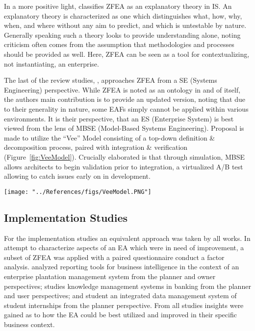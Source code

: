 \documentclass[12pt,conference]{IEEEtran}
\begin{document}
In a more positive light, \cite{zfea_as_is_theory} classifies ZFEA as an explanatory theory in IS. 
An explanatory theory is characterized as one which distinguishes what, how, why, when, and where without any aim to predict, and which is untestable by nature. 
Generally speaking such a theory looks to provide understanding alone, noting criticism often comes from the assumption that methodologies and processes should be provided as well. 
Here, ZFEA can be seen as a tool for contextualizing, not instantiating, an enterprise. 

The last of the review studies, \cite{complex_systems_engineering}, approaches ZFEA from a SE (Systems Engineering) perspective. 
While ZFEA is noted as an ontology in and of itself, the authors main contribution is to provide an updated version, noting that due to their generality in nature, some EAFs simply cannot be applied within various environments.
It is their perspective, that an ES (Enterprise System) is best viewed from the lens of MBSE (Model-Based Systems Engineering).
Proposal is made to utilize the ``Vee'' Model consisting of a top-down definition \& decomposition process, paired with integration \& verification (Figure~\ref{fig:VeeModel}). 
Crucially elaborated is that through simulation, MBSE allows architects to begin validation prior to integration, a virtualized A/B test allowing to catch issues early on in development. 

\begin{figure*}[htbp]
    \centerline{\texttt{[image: "../References/figs/VeeModel.PNG"]}}
    \caption{The ES ``Vee'' Model \cite{complex_systems_engineering}.}
    \label{fig:VeeModel}
\end{figure*}


\subsection{Implementation Studies}
For the implementation studies an equivalent approach was taken by all works. 
In attempt to characterize aspects of an EA which were in need of improvement, a subset of ZFEA was applied with a paired questionnaire conduct a factor analysis.  
\cite{zachman_in_decision_making} analyzed reporting tools for business intelligence in the context of an enterprise plantation management system from the planner and owner perspectives; \cite{analysis_of_application_zachman} studies knowledge management systems in banking from the planner and user perspectives; and \cite{implementation_of_impact} student an integrated data management system of student internships from the planner perspective.
From all studies insights were gained as to how the EA could be best utilized and improved in their specific business context. 
\end{document}
